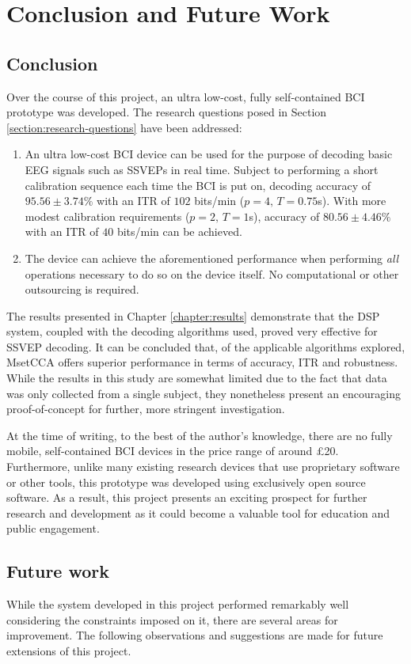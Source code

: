 \chapter{Conclusion and Future Work}
\label{chapter:conclusion}

\section{Conclusion}
Over the course of this project, an ultra low-cost, fully self-contained BCI prototype was developed. The research questions posed in Section \ref{section:research-questions} have been addressed:
\begin{enumerate}
    \item An ultra low-cost BCI device can be used for the purpose of decoding basic EEG signals such as SSVEPs in real time. Subject to performing a short calibration sequence each time the BCI is put on, decoding accuracy of $95.56 \pm 3.74\%$ with an ITR of $102$ bits/min ($p=4, \, T=0.75$s). With more modest calibration requirements ($p=2, \, T=1$s), accuracy of $80.56 \pm 4.46\%$ with an ITR of $40$ bits/min can be achieved.
    \item The device can achieve the aforementioned performance when performing \textit{all} operations necessary to do so on the device itself. No computational or other outsourcing is required.
\end{enumerate}
The results presented in Chapter \ref{chapter:results} demonstrate that the DSP system, coupled with the decoding algorithms used, proved very effective for SSVEP decoding. It can be concluded that, of the applicable algorithms explored, MsetCCA offers superior performance in terms of accuracy, ITR and robustness. While the results in this study are somewhat limited due to the fact that data was only collected from a single subject, they nonetheless present an encouraging proof-of-concept for further, more stringent investigation. 

At the time of writing, to the best of the author's knowledge, there are no fully mobile, self-contained BCI devices in the price range of around £20. Furthermore, unlike many existing research devices that use proprietary software or other tools, this prototype was developed using exclusively open source software. As a result, this project presents an exciting prospect for further research and development as it could become a valuable tool for education and public engagement. 

\section{Future work}
While the system developed in this project performed remarkably well considering the constraints imposed on it, there are several areas for improvement. The following observations and suggestions are made for future extensions of this project. 

